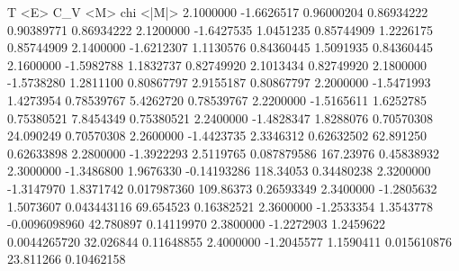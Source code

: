           T             <E>           C_V          <M>              chi            <|M|>  
      2.1000000     -1.6626517     0.96000204     0.86934222     0.90389771     0.86934222
      2.1200000     -1.6427535      1.0451235     0.85744909      1.2226175     0.85744909
      2.1400000     -1.6212307      1.1130576     0.84360445      1.5091935     0.84360445
      2.1600000     -1.5982788      1.1832737     0.82749920      2.1013434     0.82749920
      2.1800000     -1.5738280      1.2811100     0.80867797      2.9155187     0.80867797
      2.2000000     -1.5471993      1.4273954     0.78539767      5.4262720     0.78539767
      2.2200000     -1.5165611      1.6252785     0.75380521      7.8454349     0.75380521
      2.2400000     -1.4828347      1.8288076     0.70570308      24.090249     0.70570308
      2.2600000     -1.4423735      2.3346312     0.62632502      62.891250     0.62633898
      2.2800000     -1.3922293      2.5119765    0.087879586      167.23976     0.45838932
      2.3000000     -1.3486800      1.9676330    -0.14193286      118.34053     0.34480238
      2.3200000     -1.3147970      1.8371742    0.017987360      109.86373     0.26593349
      2.3400000     -1.2805632      1.5073607    0.043443116      69.654523     0.16382521
      2.3600000     -1.2533354      1.3543778  -0.0096098960      42.780897     0.14119970
      2.3800000     -1.2272903      1.2459622   0.0044265720      32.026844     0.11648855
      2.4000000     -1.2045577      1.1590411    0.015610876      23.811266     0.10462158
